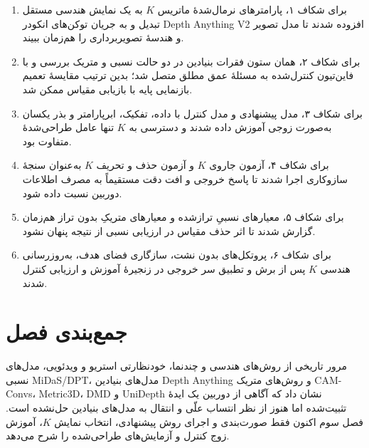 \begin{enumerate}
\item برای شکاف ۱، پارامترهای نرمال‌شدهٔ ماتریس $K$ به یک نمایش هندسی مستقل تبدیل و به جریان توکن‌های انکودر Depth Anything V2 افزوده شدند تا مدل تصویر و هندسهٔ تصویربرداری را هم‌زمان ببیند.
\item برای شکاف ۲، همان ستون فقرات بنیادین در دو حالت نسبی و متریک بررسی و با فاین‌تیون کنترل‌شده به مسئلهٔ عمق مطلق متصل شد؛ بدین ترتیب مقایسهٔ تعمیم بازنمایی پایه با بازیابی مقیاس ممکن شد.
\item برای شکاف ۳، مدل پیشنهادی و مدل کنترل با داده، تفکیک، ابرپارامتر و بذر یکسان به‌صورت زوجی آموزش داده شدند و دسترسی به $K$ تنها عامل طراحی‌شدهٔ متفاوت بود.
\item برای شکاف ۴، آزمون جاروی $K$ و آزمون حذف و تحریف $K$ به‌عنوان سنجهٔ سازوکاری اجرا شدند تا پاسخ خروجی و افت دقت مستقیماً به مصرف اطلاعات دوربین نسبت داده شود.
\item برای شکاف ۵، معیارهای نسبیِ تراز‌شده و معیارهای متریکِ بدون تراز هم‌زمان گزارش شدند تا اثر حذف مقیاس در ارزیابی نسبی از نتیجه پنهان نشود.
\item برای شکاف ۶، پروتکل‌های بدون نشت، سازگاری فضای هدف، به‌روزرسانی هندسی $K$ پس از برش و تطبیق سر خروجی در زنجیرهٔ آموزش و ارزیابی کنترل شدند.
\end{enumerate}

\section{جمع‌بندی فصل}
مرور تاریخی از روش‌های هندسی و چندنما، خودنظارتی استریو و ویدئویی، مدل‌های نسبی MiDaS/DPT، مدل‌های بنیادین Depth Anything و روش‌های متریک CAM-Convs، Metric3D، DMD و UniDepth نشان داد که آگاهی از دوربین یک ایدهٔ تثبیت‌شده اما هنوز از نظر انتساب علّی و انتقال به مدل‌های بنیادین حل‌نشده است. فصل سوم اکنون فقط صورت‌بندی و اجرای روش پیشنهادی، انتخاب نمایش $K$، آموزش زوج کنترل و آزمایش‌های طراحی‌شده را شرح می‌دهد.
